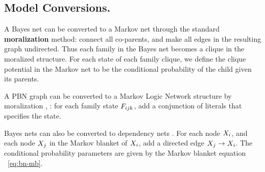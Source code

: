 \documentclass[twoside,leqno,twocolumn]{article}
\begin{document}
\subsection{Model Conversions.} \label{sec:conversions}
A Bayes net can be converted to a Markov net through the standard \textbf{moralization} method: connect all co-parents, and make all edges in the resulting graph undirected. Thus each family in the Bayes net becomes a clique in the moralized structure. For each state of each family clique, we define the clique potential in the Markov net to be the conditional probability of the child given its parents. 
%

A PBN graph can be converted to a Markov Logic Network structure by moralization \cite[12.5.3]{Domingos2007}, \cite{Schulte2012}: for each family state $F_{ijk}$, add a conjunction of literals that specifies the state.


Bayes nets can also be converted to dependency nets \cite{Heckerman2000}. For each node $X_{i}$, and each node  $X_{j}$ in the Markov blanket of $X_{i}$, add a directed edge $X_{j} \rightarrow X_{i}$. 
The conditional probability parameters are  given by the Markov blanket equation ~\eqref{eq:bn-mb}.
\end{document}
